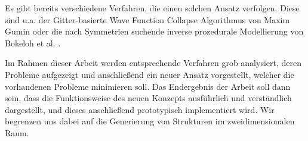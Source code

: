 Es gibt bereits verschiedene Verfahren, die einen solchen Ansatz verfolgen. Diese sind u.a. der Gitter-basierte Wave Function
Collapse Algorithmus von Maxim Gumin \cite{45_gumin} oder die nach Symmetrien suchende inverse prozedurale Modellierung von Bokeloh
et al. \cite{3_bokeloh_et_al}.

Im Rahmen dieser Arbeit werden entsprechende Verfahren grob analysiert, deren Probleme aufgezeigt und anschließend ein neuer Ansatz vorgestellt,
welcher die vorhandenen Probleme minimieren soll. Das Endergebnis der Arbeit soll dann sein, dass die Funktionsweise des neuen Konzepts
ausführlich und verständlich dargestellt, und dieses anschließend prototypisch implementiert wird. Wir begrenzen uns dabei auf die Generierung von
Strukturen im zweidimensionalen Raum.
